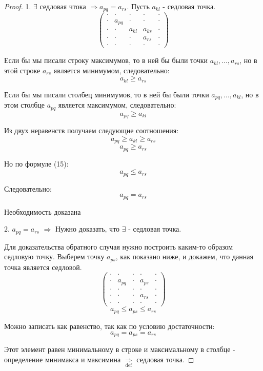 \documentclass[aps,%
12pt,%
final,%
oneside,
onecolumn,%
musixtex, %
superscriptaddress,%
centertags]{article} %
\theoremstyle{plain}
\theoremstyle{definition}
\theoremstyle{remark}
\begin{document}
\begin{proof}
  1. $\exists$  седловая чтока $\Rightarrow a_{pq} = a_{rs}$. Пусть $ a_{kl}$ - седловая точка.
  $$\begin{pmatrix}
  \cdot  & \cdot &  \cdot &  \cdot  & \cdot \\ 
  \cdot &a_{pq} & \cdot  & \cdot  & \cdot \\ 
  \cdot  & \cdot  & a_{kl} &  a_{ks} &  \cdot \\ 
  \cdot & \cdot  &  \cdot & a_{rs} &  \cdot \\ 
  \cdot & \cdot  &  \cdot  &   \cdot    &  \cdot 
  \end{pmatrix}$$

  Если бы мы писали строку максимумов, то в ней бы были точки $a_{kl},..., a_{rs}$, но в этой строке $a_{rs}$ является минимумом, следовательно: $$ a_{kl} \geq a_{rs} $$

  Если бы мы писали столбец минимумов, то в ней бы были точки $a_{pq},..., a_{kl}$, но в этом столбце $a_{pq}$ является максимумом, следовательно: 
  $$ a_{pq} \geq a_{kl}$$

  Из двух неравенств получаем следующие соотношения:
  $$ a_{pq} \geq a_{kl} \geq a_{rs} $$
  $$ a_{pq} \geq a_{rs} $$

  Но по формуле (15):
  $$ a_{pq} \leq a_{rs} $$

  Следовательно:
  $$ a_{pq} = a_{rs} $$

  Необходимость доказана

  2. $a_{pq} = a_{rs}$  $\Rightarrow $ Нужно доказать, что $\exists$ - седловая точка. 

  Для доказательства обратного случая нужно построить каким-то образом седловую точку. Выберем точку $a_{ps}$, как показано ниже, и докажем, что данная точка является седловой. 
  $$\begin{pmatrix}
  \cdot  &  \cdot &   \cdot &   \cdot  &  \cdot \\ 
  \cdot &a_{pq} &  \cdot  & a_{ps}  &  \cdot\\ 
  \cdot  &  \cdot  &  \cdot &   \cdot &   \cdot \\ 
  \cdot &  \cdot  &   \cdot & a_{rs} & \cdot \\ 
  \cdot &  \cdot  &   \cdot  &    \cdot    &   \cdot
  \end{pmatrix}$$
  $$a_{pq} \leq a_{ps} \leq a_{rs}$$

  Можно записать как равенство, так как по условию достаточности:
  $$ a_{pq} = a_{ps} = a_{rs}$$

  Этот элемент равен минимальному в строке и максимальному в столбце - определение минимакса и максимина $\underset{\text{def}}{\Rightarrow}$ седловая точка. 
\end{proof}
\end{document}
